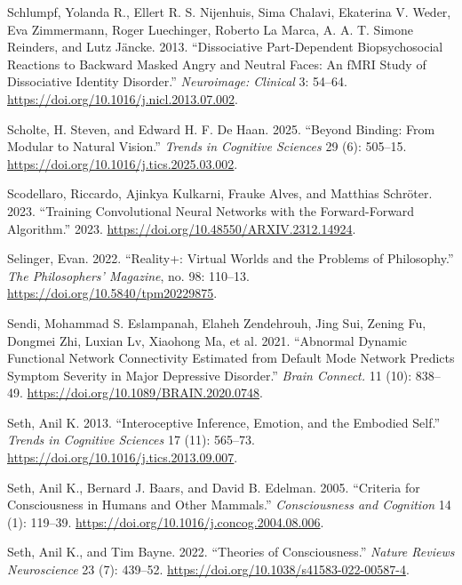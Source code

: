 \documentclass[
  a4paper]{article}
\newlength{\cslhangindent}
\newenvironment{CSLReferences}[2] %
 {\begin{list}{}{%
  \setlength{\itemindent}{0pt}
  \setlength{\leftmargin}{0pt}
  \setlength{\parsep}{0pt}
  \ifodd #1
   \setlength{\leftmargin}{\cslhangindent}
   \setlength{\itemindent}{-1\cslhangindent}
  \fi
  \setlength{\itemsep}{#2\baselineskip}}}
 {\end{list}}
\begin{document}
\begin{CSLReferences}{1}{0}
Schlumpf, Yolanda R., Ellert R. S. Nijenhuis, Sima Chalavi, Ekaterina V.
Weder, Eva Zimmermann, Roger Luechinger, Roberto La Marca, A. A. T.
Simone Reinders, and Lutz Jäncke. 2013. {``Dissociative Part-Dependent
Biopsychosocial Reactions to Backward Masked Angry and Neutral Faces: An
{fMRI} Study of Dissociative Identity Disorder.''} \emph{Neuroimage:
Clinical} 3: 54--64. \url{https://doi.org/10.1016/j.nicl.2013.07.002}.

Scholte, H. Steven, and Edward H. F. De Haan. 2025. {``Beyond Binding:
From Modular to Natural Vision.''} \emph{Trends in Cognitive Sciences}
29 (6): 505--15. \url{https://doi.org/10.1016/j.tics.2025.03.002}.

Scodellaro, Riccardo, Ajinkya Kulkarni, Frauke Alves, and Matthias
Schröter. 2023. {``Training Convolutional Neural Networks with the
Forward-Forward Algorithm.''} 2023.
\url{https://doi.org/10.48550/ARXIV.2312.14924}.

Selinger, Evan. 2022. {``Reality+: Virtual Worlds and the Problems of
Philosophy.''} \emph{The Philosophers' Magazine}, no. 98: 110--13.
\url{https://doi.org/10.5840/tpm20229875}.

Sendi, Mohammad S. Eslampanah, Elaheh Zendehrouh, Jing Sui, Zening Fu,
Dongmei Zhi, Luxian Lv, Xiaohong Ma, et al. 2021. {``Abnormal Dynamic
Functional Network Connectivity Estimated from Default Mode Network
Predicts Symptom Severity in Major Depressive Disorder.''} \emph{Brain
Connect.} 11 (10): 838--49.
\url{https://doi.org/10.1089/BRAIN.2020.0748}.

Seth, Anil K. 2013. {``Interoceptive Inference, Emotion, and the
Embodied Self.''} \emph{Trends in Cognitive Sciences} 17 (11): 565--73.
\url{https://doi.org/10.1016/j.tics.2013.09.007}.

Seth, Anil K., Bernard J. Baars, and David B. Edelman. 2005. {``Criteria
for Consciousness in Humans and Other Mammals.''} \emph{Consciousness
and Cognition} 14 (1): 119--39.
\url{https://doi.org/10.1016/j.concog.2004.08.006}.

Seth, Anil K., and Tim Bayne. 2022. {``Theories of Consciousness.''}
\emph{Nature Reviews Neuroscience} 23 (7): 439--52.
\url{https://doi.org/10.1038/s41583-022-00587-4}.


\end{CSLReferences}
\end{document}
